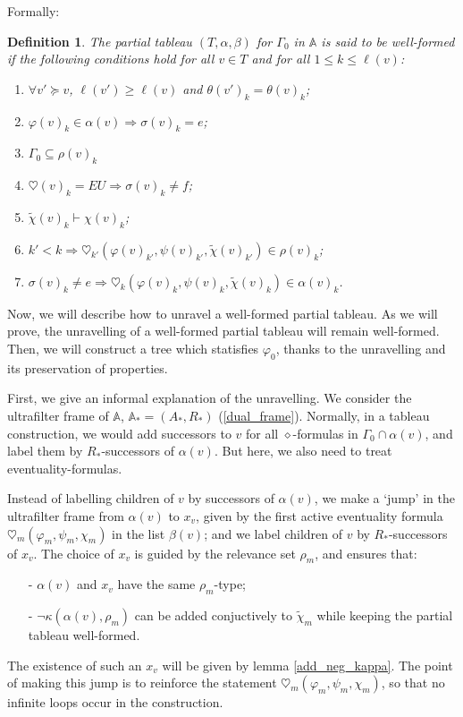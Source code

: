 \documentclass[11pt]{article}
\newcommand{\A}{{\mathbb A}}
\newtheorem{definition}{Definition}[section]
\begin{document}
Formally:
\begin{definition}\label{well_formed_partial_tableau}
    The partial tableau $(T,\alpha,\beta)$ for $\Gamma_0$ in $\A$ is said to be \emph{well-formed} if the following conditions hold for all $v\in T$ and for all $1\leq k\leq \ell(v)$:
    \begin{enumerate}[label=(\alph*)]
        \setlength\itemsep{0em}
        \item $\forall v'\succeq v$, $\ell(v')\geq\ell(v)$ and $\theta(v')_k = \theta(v)_k$;
        \item $\varphi(v)_k\in\alpha(v)\Rightarrow\sigma(v)_k=e$;
        \item $\Gamma_0\subseteq\rho(v)_k$
        \item $\heartsuit(v)_k=EU \Rightarrow \sigma(v)_k\not=f$;
        \item $\tilde{\chi}(v)_k\vdash\chi(v)_k$;
        \item $k'<k\Rightarrow\heartsuit_{k'}(\varphi(v)_{k'},\psi(v)_{k'},\tilde{\chi}(v)_{k'})\in\rho(v)_k$;
        \item $\sigma(v)_k\not=e\Rightarrow\heartsuit_{k}(\varphi(v)_{k},\psi(v)_{k},\tilde{\chi}(v)_{k})\in\alpha(v)_k$.
    \end{enumerate}
\end{definition}

Now, we will describe how to unravel a well-formed partial tableau. As we will prove, the unravelling of a well-formed partial tableau will remain well-formed. Then, we will construct a tree which statisfies $\varphi_0$, thanks to the unravelling and its preservation of properties.

First, we give an informal explanation of the unravelling. We consider the ultrafilter frame of $\A$, $\A_*=(A_*,R_*)$ (\ref{dual_frame}). Normally, in a tableau construction, we would add successors to $v$ for all $\diamond$-formulas in $\Gamma_0\cap\alpha(v)$, and label them by $R_*$-successors of $\alpha(v)$. But here, we also need to treat eventuality-formulas.

Instead of labelling children of $v$ by successors of $\alpha(v)$, we make a `jump' in the ultrafilter frame from $\alpha(v)$ to $x_v$, given by the first active eventuality formula $\heartsuit_m(\varphi_m,\psi_m,\chi_m)$ in the list $\beta(v)$; and we label children of $v$ by $R_*$-successors of $x_v$. The choice of $x_v$ is guided by the relevance set $\rho_m$, and ensures that:
\begin{itemize}
    \item[-]$\alpha(v)$ and $x_v$ have the same $\rho_m$-type;
    \item[-]$\neg\kappa(\alpha(v),\rho_m)$ can be added conjuctively to $\tilde{\chi}_m$ while keeping the partial tableau well-formed.  
\end{itemize}
The existence of such an $x_v$ will be given by lemma \ref{add_neg_kappa}. The point of making this jump is to reinforce the statement $\heartsuit_m(\varphi_m,\psi_m,\chi_m)$, so that no infinite loops occur in the construction.
\end{document}
